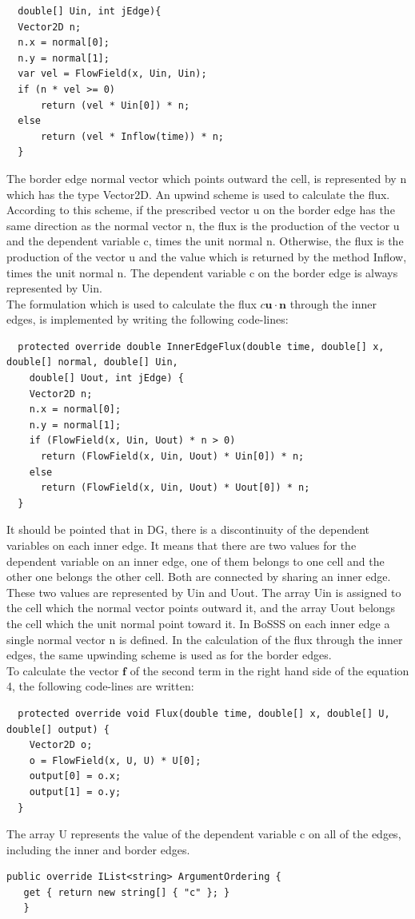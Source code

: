 \documentclass[11pt,twoside,a4paper]{fdyartcl}
\begin{document}
{{{\begin{verbatim}
  double[] Uin, int jEdge){
  Vector2D n; 
  n.x = normal[0]; 
  n.y = normal[1];
  var vel = FlowField(x, Uin, Uin);
  if (n * vel >= 0)
	  return (vel * Uin[0]) * n;
  else
	  return (vel * Inflow(time)) * n;
  }
\end{verbatim}}
The border edge normal vector which points outward the cell, is represented by {\scriptsize n} which has the type {\scriptsize Vector2D}. An upwind scheme is used to calculate the flux. According to this scheme, if the prescribed vector {\scriptsize u} on the border edge has the same direction as the normal vector {\scriptsize n}, the flux is the production of the vector {\scriptsize u} and the dependent variable {\scriptsize c}, times the unit normal {\scriptsize n}. Otherwise, the flux is the production of the vector {\scriptsize u} and the value which is returned by the method {\scriptsize Inflow}, times the unit normal {\scriptsize n}. The dependent variable {\scriptsize c} on the border edge is always represented by {\scriptsize Uin}.\\
The formulation which is used to calculate the flux $c\mathbf{u}\cdot\mathbf{n}$ through the inner edges, is implemented by writing the following code-lines:
{\scriptsize \begin{verbatim}
  protected override double InnerEdgeFlux(double time, double[] x, double[] normal, double[] Uin, 
    double[] Uout, int jEdge) {
    Vector2D n;
    n.x = normal[0];
    n.y = normal[1];
    if (FlowField(x, Uin, Uout) * n > 0)
      return (FlowField(x, Uin, Uout) * Uin[0]) * n;
    else
      return (FlowField(x, Uin, Uout) * Uout[0]) * n;
  }
\end{verbatim}}
It should be pointed that in DG, there is a discontinuity of the dependent variables on each inner edge. It means that there are two values for the dependent variable on an inner edge, one of them belongs to one cell and the other one belongs the other cell. Both are connected by sharing an inner edge. These two values are represented by {\scriptsize Uin} and {\scriptsize Uout}. The array {\scriptsize Uin} is assigned to the cell which the normal vector points outward it, and the array {\scriptsize Uout} belongs the cell which the unit normal point toward it. In BoSSS on each inner edge a single normal vector {\scriptsize n} is defined. In the calculation of the flux through the inner edges, the same upwinding scheme is used as for the border edges.\\
 To calculate the vector $\mathbf{f}$ of the second term in the right hand side of the equation 4, the following code-lines are written:
{\scriptsize \begin{verbatim}
  protected override void Flux(double time, double[] x, double[] U, double[] output) {
    Vector2D o;
    o = FlowField(x, U, U) * U[0];
    output[0] = o.x;
    output[1] = o.y;
  }
\end{verbatim}}
The array {\scriptsize U} represents the value of the dependent variable {\scriptsize c} on all of the edges, including the inner and border edges.
{\scriptsize \begin{verbatim}
public override IList<string> ArgumentOrdering {
   get { return new string[] { "c" }; }
   }
  

\end{verbatim}}}}
\end{document}
